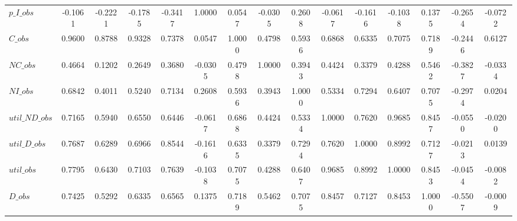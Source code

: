 \begin{center}
\begin{longtable}{lcccccccccccccc}
$p\_I\_obs      $	 & 	          -0.1061	 & 	          -0.2221	 & 	          -0.1785	 & 	          -0.3417	 & 	           1.0000	 & 	           0.0547	 & 	          -0.0305	 & 	           0.2608	 & 	          -0.0617	 & 	          -0.1616	 & 	          -0.1038	 & 	           0.1375	 & 	          -0.2654	 & 	          -0.0722 \\ 
$C\_obs         $	 & 	           0.9600	 & 	           0.8788	 & 	           0.9328	 & 	           0.7378	 & 	           0.0547	 & 	           1.0000	 & 	           0.4798	 & 	           0.5936	 & 	           0.6868	 & 	           0.6335	 & 	           0.7075	 & 	           0.7189	 & 	          -0.2446	 & 	           0.6127 \\ 
$NC\_obs        $	 & 	           0.4664	 & 	           0.1202	 & 	           0.2649	 & 	           0.3680	 & 	          -0.0305	 & 	           0.4798	 & 	           1.0000	 & 	           0.3943	 & 	           0.4424	 & 	           0.3379	 & 	           0.4288	 & 	           0.5462	 & 	          -0.3827	 & 	          -0.0334 \\ 
$NI\_obs        $	 & 	           0.6842	 & 	           0.4011	 & 	           0.5240	 & 	           0.7134	 & 	           0.2608	 & 	           0.5936	 & 	           0.3943	 & 	           1.0000	 & 	           0.5334	 & 	           0.7294	 & 	           0.6407	 & 	           0.7075	 & 	          -0.2974	 & 	           0.0204 \\ 
$util\_ND\_obs  $	 & 	           0.7165	 & 	           0.5940	 & 	           0.6550	 & 	           0.6446	 & 	          -0.0617	 & 	           0.6868	 & 	           0.4424	 & 	           0.5334	 & 	           1.0000	 & 	           0.7620	 & 	           0.9685	 & 	           0.8457	 & 	          -0.0550	 & 	          -0.0200 \\ 
$util\_D\_obs   $	 & 	           0.7687	 & 	           0.6289	 & 	           0.6966	 & 	           0.8544	 & 	          -0.1616	 & 	           0.6335	 & 	           0.3379	 & 	           0.7294	 & 	           0.7620	 & 	           1.0000	 & 	           0.8992	 & 	           0.7127	 & 	          -0.0213	 & 	           0.0139 \\ 
$util\_obs      $	 & 	           0.7795	 & 	           0.6430	 & 	           0.7103	 & 	           0.7639	 & 	          -0.1038	 & 	           0.7075	 & 	           0.4288	 & 	           0.6407	 & 	           0.9685	 & 	           0.8992	 & 	           1.0000	 & 	           0.8453	 & 	          -0.0454	 & 	          -0.0082 \\ 
$D\_obs         $	 & 	           0.7425	 & 	           0.5292	 & 	           0.6335	 & 	           0.6565	 & 	           0.1375	 & 	           0.7189	 & 	           0.5462	 & 	           0.7075	 & 	           0.8457	 & 	           0.7127	 & 	           0.8453	 & 	           1.0000	 & 	          -0.5507	 & 	          -0.0009 \\ 

\end{longtable}
\end{center}
